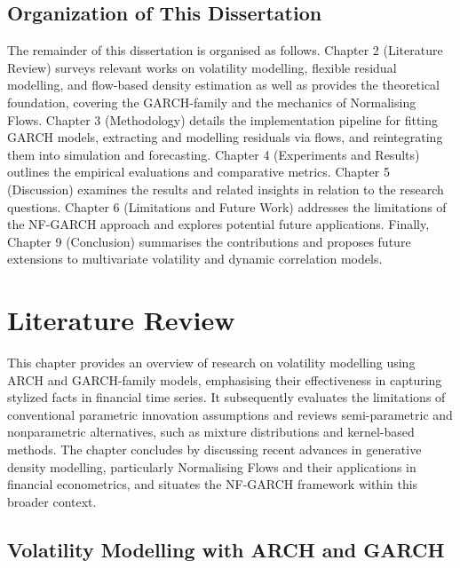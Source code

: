 \documentclass[oneside,12pt]{CUEDthesisPSnPDF}
\begin{document}
\section{Organization of This Dissertation}
\noindent
The remainder of this dissertation is organised as follows. Chapter 2 (Literature Review) surveys relevant works on volatility modelling, flexible residual modelling, and flow-based density estimation as well as provides the theoretical foundation, covering the GARCH-family and the mechanics of Normalising Flows. Chapter 3 (Methodology) details the implementation pipeline for fitting GARCH models, extracting and modelling residuals via flows, and reintegrating them into simulation and forecasting. Chapter 4 (Experiments and Results) outlines the empirical evaluations and comparative metrics. Chapter 5 (Discussion) examines the results and related insights in relation to the research questions. Chapter 6 (Limitations and Future Work) addresses the limitations of the NF-GARCH approach and explores potential future applications. Finally, Chapter 9 (Conclusion) summarises the contributions and proposes future extensions to multivariate volatility and dynamic correlation models.\\


\chapter{Literature Review}
\noindent
This chapter provides an overview of research on volatility modelling using ARCH and GARCH-family models, emphasising their effectiveness in capturing stylized facts in financial time series. It subsequently evaluates the limitations of conventional parametric innovation assumptions and reviews semi-parametric and nonparametric alternatives, such as mixture distributions and kernel-based methods. The chapter concludes by discussing recent advances in generative density modelling, particularly Normalising Flows and their applications in financial econometrics, and situates the NF-GARCH framework within this broader context.\\


\section{Volatility Modelling with ARCH and GARCH}
\end{document}
